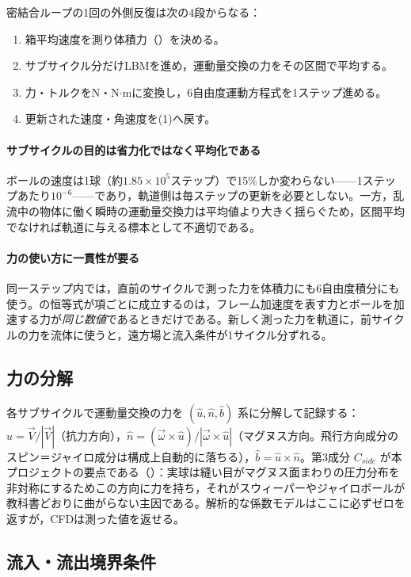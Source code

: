 密結合ループの1回の外側反復は次の4段からなる：

\begin{enumerate}
	\item 箱平均速度を測り体積力（）を決める。
	\item サブサイクル分だけLBMを進め，運動量交換の力をその区間で平均する。
	\item 力・トルクをN・N\(\cdot\)mに変換し，6自由度運動方程式を1ステップ進める。
	\item 更新された速度・角速度を(1)へ戻す。
\end{enumerate}

\paragraph{サブサイクルの目的は省力化ではなく平均化である}
ボールの速度は1球（約\(1.85\times10^5\)ステップ）で15\%しか変わらない——1ステップあたり\(10^{-6}\)——であり，軌道側は毎ステップの更新を必要としない。一方，乱流中の物体に働く瞬時の運動量交換力は平均値より大きく揺らぐため，区間平均でなければ軌道に与える標本として不適切である。

\paragraph{力の使い方に一貫性が要る}
同一ステップ内では，直前のサイクルで測った力を体積力にも6自由度積分にも使う。の恒等式が項ごとに成立するのは，フレーム加速度を表す力とボールを加速する力が\emph{同じ数値}であるときだけである。新しく測った力を軌道に，前サイクルの力を流体に使うと，遠方場と流入条件が1サイクル分ずれる。

\subsection{力の分解}

各サブサイクルで運動量交換の力を \((\hat u,\hat n,\hat b)\) 系に分解して記録する：\(\hat u=\vec V/|\vec V|\)（抗力方向），\(\hat n=(\vec\omega\times\hat u)/|\vec\omega\times\hat u|\)（マグヌス方向。飛行方向成分のスピン＝ジャイロ成分は構成上自動的に落ちる），\(\hat b=\hat u\times\hat n\)。第3成分 \(C_{side}\) が本プロジェクトの要点である（）：実球は縫い目がマグヌス面まわりの圧力分布を非対称にするためこの方向に力を持ち，それがスウィーパーやジャイロボールが教科書どおりに曲がらない主因である。解析的な係数モデルはここに必ずゼロを返すが，CFDは測った値を返せる。

\subsection{流入・流出境界条件}
\label{sec:open-boundary}


